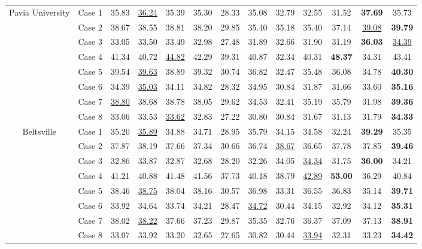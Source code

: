 \begin{table*}[t]
\begin{center}
{\begin{tabular}{cc ccccccccccc}
				\multirow{8}{*}{Pavia University} 
				& Case 1 & 
				35.83 & \underline{36.24} & 35.39 & 35.30 & 28.33 & 35.08 & 32.79 & 32.55 & 31.52 & \textbf{37.69} & 35.73 \\ 
				& Case 2 & 
				38.67 & 38.55 & 38.81 & 38.20 & 29.85 & 35.40 & 35.18 & 35.40 & 37.14 & \underline{39.08} & \textbf{39.79} \\ 
				& Case 3 & 
				33.05 & 33.50 & 33.49 & 32.98 & 27.48 & 31.89 & 32.66 & 31.90 & 31.19 & \textbf{36.03} & \underline{34.39} \\ 
				& Case 4 & 
				41.34 & 40.72 & \underline{44.82} & 42.29 & 39.31 & 40.87 & 32.34 & 40.31 & \textbf{48.37} & 34.31 & 43.41 \\ 
				& Case 5 & 
				39.54 & \underline{39.63} & 38.89 & 39.32 & 30.74 & 36.82 & 32.47 & 35.48 & 36.08 & 34.78 & \textbf{40.30} \\ 
				& Case 6 & 
				34.39 & \underline{35.03} & 34.11 & 34.82 & 28.32 & 34.95 & 30.84 & 31.87 & 31.66 & 33.60 & \textbf{35.16} \\ 
				& Case 7 & 
				\underline{38.80} & 38.68 & 38.78 & 38.05 & 29.62 & 34.53 & 32.41 & 35.19 & 35.79 & 31.98 & \textbf{39.36} \\ 
				& Case 8 & 
				33.06 & 33.53 & \underline{33.62} & 32.83 & 27.22 & 30.80 & 30.84 & 31.67 & 31.13 & 31.79 & \textbf{34.33} \\ 
				
				\cmidrule(lr){1-13} 
				
				\multirow{8}{*}{Beltsville} 
				& Case 1 & 
				35.20 & \underline{35.89} & 34.88 & 34.71 & 28.95 & 35.79 & 34.15 & 34.58 & 32.24 & \textbf{39.29} & 35.35 \\ 
				& Case 2 & 
				37.87 & 38.19 & 37.66 & 37.34 & 30.66 & 36.74 & \underline{38.67} & 36.65 & 37.78 & 37.85 & \textbf{39.46} \\ 
				& Case 3 & 
				32.86 & 33.87 & 32.87 & 32.68 & 28.20 & 32.26 & 34.05 & \underline{34.34} & 31.75 & \textbf{36.00} & 34.21 \\ 
				& Case 4 & 
				41.21 & 40.88 & 41.48 & 41.56 & 37.73 & 40.18 & 38.79 & \underline{42.89} & \textbf{53.00} & 36.29 & 40.84 \\ 
				& Case 5 & 
				38.46 & \underline{38.75} & 38.04 & 38.16 & 30.57 & 36.98 & 33.31 & 36.55 & 36.83 & 35.14 & \textbf{39.71} \\ 
				& Case 6 & 
				33.92 & 34.64 & 33.74 & 34.21 & 28.47 & \underline{34.72} & 30.44 & 34.15 & 32.92 & 34.12 & \textbf{35.31} \\ 
				& Case 7 & 
				38.02 & \underline{38.22} & 37.66 & 37.23 & 29.87 & 35.35 & 32.76 & 36.37 & 37.09 & 37.13 & \textbf{38.91} \\ 
				& Case 8 & 
				33.07 & 33.92 & 33.20 & 32.65 & 27.65 & 30.82 & 30.44 & \underline{33.94} & 32.31 & 33.23 & \textbf{34.42} \\ 
				
				\bottomrule
			\end{tabular}
		}
	\end{center}
\end{table*}
